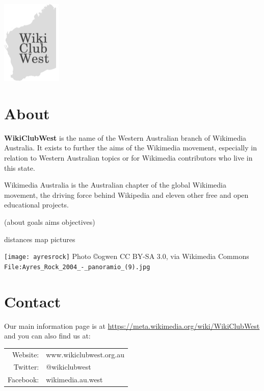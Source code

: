 \documentclass[a4paper]{article}
\begin{document}
\pagestyle{empty}

\begin{multicols}{3}

\begin{center}
\includegraphics[height=4cm]{logo.pdf}

\end{center}

\section{About}

\textbf{WikiClubWest} is the name of the Western Australian branch of Wikimedia Australia.
It exists to further the aims of the Wikimedia movement, especially in relation to Western Australian topics or for Wikimedia contributors who live in this state.

Wikimedia Australia is the Australian chapter of the global Wikimedia movement, the driving force behind Wikipedia and eleven other free and open educational projects.

(about goals aims objectives)

distances map
pictures

\texttt{[image: ayresrock]}
{\footnotesize Photo \copyright ogwen CC BY-SA 3.0, via Wikimedia Commons {\tt File:Ayres\_Rock\_2004\_-\_panoramio\_(9).jpg}}

\section{Contact}

Our main information page is at
\url{https://meta.wikimedia.org/wiki/WikiClubWest}
and you can also find us at:

\begin{tabular}{rl}
Website: & www.wikiclubwest.org.au \\
Twitter: & @wikiclubwest \\
Facebook: & wikimedia.au.west \\
\end{tabular}


\end{multicols}
\end{document}
